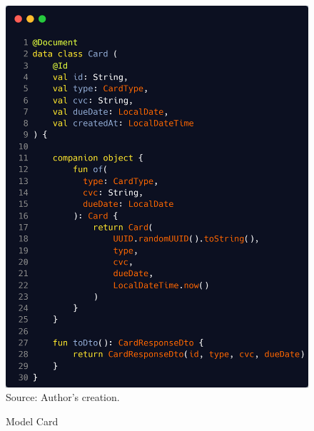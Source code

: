 \begin{figure}[HContext]
	\centering
	\caption{Model Card}
	\includegraphics[width=1\linewidthContext]{figures/card}
	\label{fig:card}
	\footnotesize Source: Author's creation.
\end{figure}

